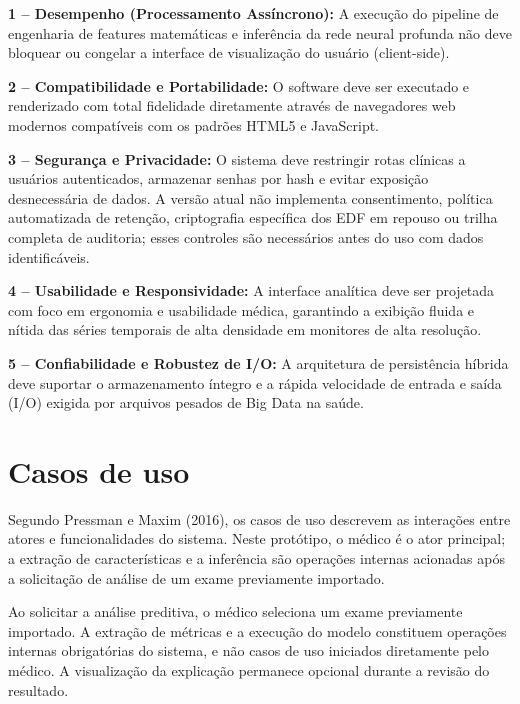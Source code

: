 \noindent \textbf{1 – Desempenho (Processamento Assíncrono):} A execução do pipeline de engenharia de features matemáticas e inferência da rede neural profunda não deve bloquear ou congelar a interface de visualização do usuário (client-side).\par
\noindent \textbf{2 – Compatibilidade e Portabilidade:} O software deve ser executado e renderizado com total fidelidade diretamente através de navegadores web modernos compatíveis com os padrões HTML5 e JavaScript.\par
\noindent \textbf{3 – Segurança e Privacidade: }O sistema deve restringir rotas clínicas a usuários autenticados, armazenar senhas por hash e evitar exposição desnecessária de dados. A versão atual não implementa consentimento, política automatizada de retenção, criptografia específica dos EDF em repouso ou trilha completa de auditoria; esses controles são necessários antes do uso com dados identificáveis.\par
\noindent \textbf{4 – Usabilidade e Responsividade:} A interface analítica deve ser projetada com foco em ergonomia e usabilidade médica, garantindo a exibição fluida e nítida das séries temporais de alta densidade em monitores de alta resolução.\par
\noindent \textbf{5 – Confiabilidade e Robustez de I/O:} A arquitetura de persistência híbrida deve suportar o armazenamento íntegro e a rápida velocidade de entrada e saída (I/O) exigida por arquivos pesados de Big Data na saúde.\par
{}\section{Casos de uso}
Segundo Pressman e Maxim (2016), os casos de uso descrevem as interações entre atores e funcionalidades do sistema. Neste protótipo, o médico é o ator principal; a extração de características e a inferência são operações internas acionadas após a solicitação de análise de um exame previamente importado.

Ao solicitar a análise preditiva, o médico seleciona um exame previamente importado. A extração de métricas e a execução do modelo constituem operações internas obrigatórias do sistema, e não casos de uso iniciados diretamente pelo médico. A visualização da explicação permanece opcional durante a revisão do resultado.

